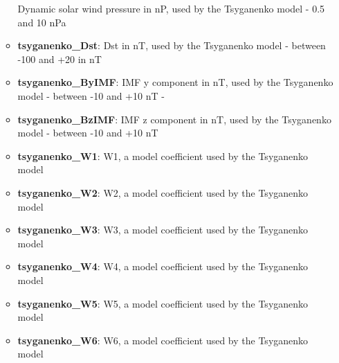 \documentclass[10pt]{article}
\begin{document}
\begin{itemize}
\begin{itemize}
      Dynamic solar wind pressure in nP, used by the Tsyganenko model
      - 0.5 and 10 nPa
    \item{\bf tsyganenko\_Dst}:
      Dst in nT, used by the Tsyganenko model - between -100 and +20 in nT
    \item{\bf tsyganenko\_ByIMF}:
      IMF y component in nT, used by the Tsyganenko model - between
      -10 and +10 nT -
    \item{\bf tsyganenko\_BzIMF}:
      IMF z component in nT, used by the Tsyganenko model - between
      -10 and +10 nT
    \item{\bf tsyganenko\_W1}:
      W1, a model coefficient used by the Tsyganenko model
    \item{\bf tsyganenko\_W2}:
      W2, a model coefficient used by the Tsyganenko model
    \item{\bf tsyganenko\_W3}:
      W3, a model coefficient used by the Tsyganenko model
    \item{\bf tsyganenko\_W4}:
      W4, a model coefficient used by the Tsyganenko model
    \item{\bf tsyganenko\_W5}:
      W5, a model coefficient used by the Tsyganenko model
    \item{\bf tsyganenko\_W6}:
      W6, a model coefficient used by the Tsyganenko model
    \end{itemize}


\end{itemize}
\end{document}
